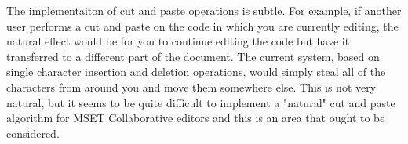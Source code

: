 \documentclass{amsart}
\begin{document}
The implementaiton of cut and paste operations is subtle. For example, if another user performs a cut and paste on the code in which you are currently editing, the natural effect would be for you to continue editing the code but have it transferred to a different part of the document.  The current system, based on single character insertion and deletion operations, would simply steal all of the characters from around you and move them somewhere else. This is not very natural, but it seems to be quite difficult to implement a "natural" cut and paste algorithm for MSET Collaborative editors and this is an area that ought to be considered.








\end{document}
